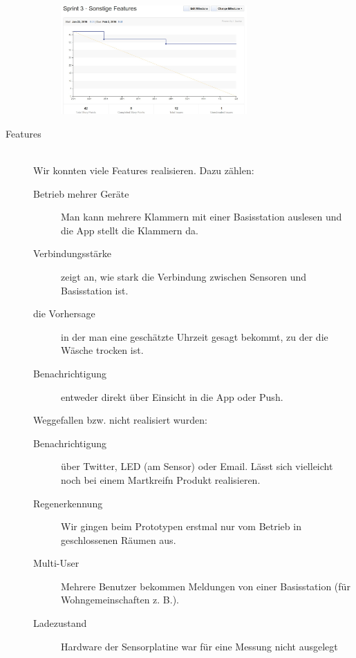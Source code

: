 \begin{description}
		\begin{figure}[H]
			\centering
			\includegraphics[width=0.7\textwidth]{burndown_sprint3.jpg}
		\end{figure}

	\item [Features] \hfill \\
		Wir konnten viele Features realisieren. Dazu zählen:
		\begin{description}
			\item [Betrieb mehrer Geräte] Man kann mehrere Klammern mit einer Basisstation auslesen und die App stellt die Klammern da.
			\item [Verbindungsstärke] zeigt an, wie stark die Verbindung zwischen Sensoren und Basisstation ist.
			\item [die Vorhersage] in der man eine geschätzte Uhrzeit gesagt bekommt, zu der die Wäsche trocken ist.
			\item [Benachrichtigung] entweder direkt über Einsicht in die App oder Push.
		\end{description}
		Weggefallen bzw. nicht realisiert wurden:
		\begin{description}
			\item [Benachrichtigung] über Twitter, LED (am Sensor) oder Email. Lässt sich vielleicht noch bei einem Martkreifn Produkt realisieren.
			\item [Regenerkennung] Wir gingen beim Prototypen erstmal nur vom Betrieb in geschlossenen Räumen aus.
			\item [Multi-User] Mehrere Benutzer bekommen Meldungen von einer Basisstation (für Wohngemeinschaften z. B.).
			\item [Ladezustand] Hardware der Sensorplatine war für eine Messung nicht ausgelegt
		\end{description}
\end{description}